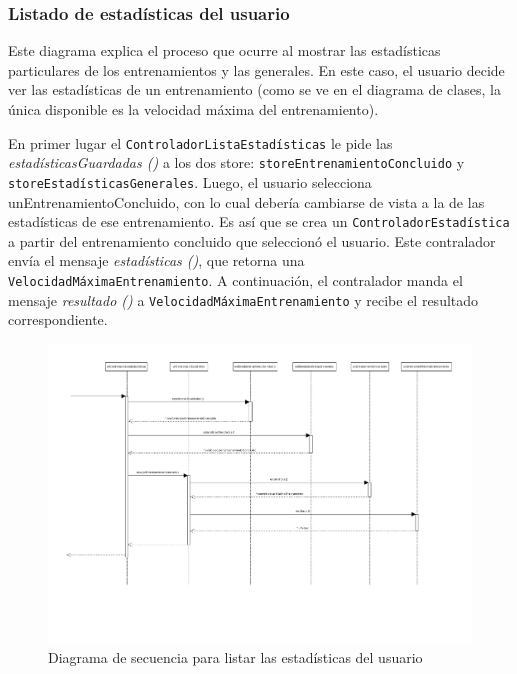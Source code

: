 \newpage

\subsubsection{Listado de estadísticas del usuario}

Este diagrama explica el proceso que ocurre al mostrar las estadísticas particulares de los entrenamientos y las generales. En este caso, el usuario decide ver las estadísticas de un entrenamiento (como se ve en el diagrama de clases, la única disponible es la velocidad máxima del entrenamiento).


En primer lugar el \texttt{ControladorListaEstadísticas} le pide las \emph{estadísticasGuardadas ()} a los dos store: \texttt{storeEntrenamientoConcluido} y \texttt{storeEstadísticasGenerales}. Luego, el usuario selecciona {unEntrenamientoConcluido}, con lo cual debería cambiarse de vista a la de las estadísticas de ese entrenamiento. Es así que se crea un \texttt{ControladorEstadística} a partir del entrenamiento concluido que seleccionó el usuario. Este contralador envía el mensaje \emph{estadísticas ()}, que retorna una \texttt{VelocidadMáximaEntrenamiento}. A continuación, el contralador manda el mensaje \emph{resultado ()} a \texttt{VelocidadMáximaEntrenamiento} y recibe el resultado correspondiente. 

\newpage

\begin{landscape}
	\begin{figure}[h]
		\includegraphics[scale=0.8]{images/ListadoEstadisticas.pdf}
		\caption{Diagrama de secuencia para listar las estadísticas del usuario}
	\end{figure} 
\end{landscape}

